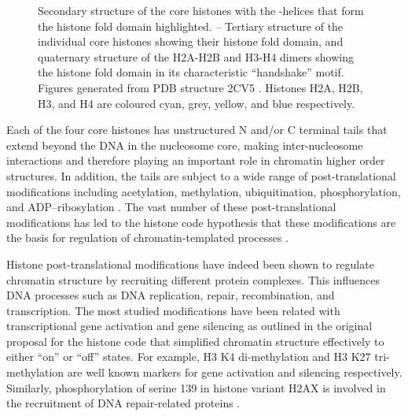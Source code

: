 \begin{figure}
                     {
                       Secondary structure of the core histones with
                       the \textalpha-helices that form the histone
                       fold domain highlighted.
                       --%
                       Tertiary structure of the individual core
                       histones showing their histone fold domain, and
                       quaternary structure of the H2A-H2B and H3-H4
                       dimers showing the histone fold domain in its
                       characteristic ``handshake'' motif.  Figures
                       generated from PDB structure 2CV5
                       \citep{tsunaka2005-2cv5}.  Histones H2A, H2B,
                       H3, and H4 are coloured cyan, grey, yellow, and
                       blue respectively.}
        \label{fig:intro:histone-fold-domain}
      \end{figure}


      Each of the four core histones has unstructured N and/or C
      terminal tails that extend beyond the DNA in the nucleosome core,
      making inter-nucleosome interactions and therefore
      playing an important
      role in chromatin higher order structures.
      In addition, the tails are subject to a wide range of
      post-translational modifications
      including acetylation, methylation, ubiquitination, phosphorylation,
      and ADP--ribosylation \citep{bannister2011ptm-review}.
      The vast number of these post-translational modifications has led to the
      histone code hypothesis that these modifications are the basis for
      regulation of chromatin-templated processes \citep{jenuwein200histone-code}.


      Histone post-translational modifications have indeed been shown to
      regulate chromatin structure
      by recruiting different protein complexes.
      This influences
      DNA processes such as DNA replication, repair, recombination,
      and transcription.
      The most studied modifications have been related with transcriptional
      gene activation and gene silencing as outlined in
      the original proposal for the histone code \citep{jenuwein200histone-code}
      that simplified chromatin structure
      effectively to either ``on'' or ``off'' states.
      For example,
      H3 K4 di-methylation and H3 K27 tri-methylation are well known
      markers for gene activation and silencing respectively.
      Similarly,
      phosphorylation of serine 139 in histone variant H2AX
      is involved
      in the recruitment of DNA repair-related proteins
      \citep{our-H2AX-review}.

